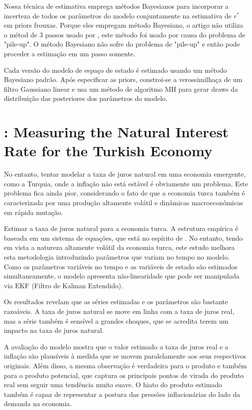 Nossa técnica de estimativa emprega métodos Bayesianos para incorporar a incerteza de todos os parâmetros do modelo conjuntamente na estimativa de $r^*$ em priors frouxas. Porque eles empregam método Bayesiano, o artigo não utiliza o métod de 3 passos usado por \citet{LW:2003}, este método foi usado por causa do problema de "pile-up". O método Bayesiano não sofre do problema de "pile-up" e então pode proceder a estimação em um passo somente. 

Cada versão do modelo de espaço de estado é estimado usando um método Bayesiano padrão. Após especificar as priors, constroi-se a verossimilhaça de um filtro Gaussiano linear e usa um método de algoritmo MH para gerar draws da distribuição das posteriores dos parâmetros do modelo.
%
%
\section{\citet{Us:2018}: Measuring the Natural Interest Rate for the Turkish Economy }

No entanto, tentar modelar a taxa de juros natural em uma economia emergente, como a Turquia, onde a inflação não está estável é obviamente um problema. Este problema fica ainda pior, considerando o fato de que a economia turca também é caracterizada por uma produção altamente volátil e dinâmicas macroeconômicas em rápida mutação.

Estimar a taxa de juros natural para a economia turca. A estrutura empírica é baseada em um sistema de equações, que está no espírito de \citet{LW:2003}. No entanto, tendo em vista a natureza altamente volátil da economia turca, este estudo melhora esta metodologia introduzindo parâmetros que variam no tempo no modelo. Como os parâmetros variáveis no tempo e as variáveis de estado são estimados simultaneamente, o modelo apresenta não-linearidade que pode ser manipulada via EKF (Filtro de Kalman Extendido).

Os resultados revelam que as séries estimadas e os parâmetros
são bastante razoáveis. A taxa de juros natural se move em linha com a taxa de juros real, mas a série também é sensível a grandes choques, que se acredita terem um impacto na taxa de juros natural.

A avaliação do modelo mostra que o valor estimado a taxa de juros real e a inflação são plausíveis à medida que se movem paralelamente aos seus respectivos originais. Além disso, a mesma observação é verdadeira para o produto e também para o produto potencial, que captura os principais pontos de virada do produto real sem seguir uma tendência muito suave. O hiato do produto estimado também é capaz de representar a postura das pressões inflacionárias do lado da demanda na economia.

